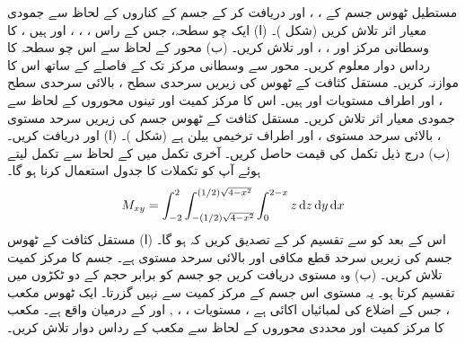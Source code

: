 مستطیل ٹھوس جسم کے ، ،  اور  دریافت کر کے  جسم کے کناروں کے لحاظ سے جمودی معیار اثر تلاش کریں (شکل )۔
(ا) ایک چو سطحہ،  جس کے راس ، ، ،  اور   ہیں ، کا وسطانی مرکز اور ،  ، اور  تلاش کریں۔ (ب) محور  کے لحاظ سے اس  چو سطحہ کا رداس دوار معلوم کریں۔ محور  سے وسطانی مرکز  تک کے   فاصلے کے ساتھ اس کا موازنہ کریں۔
مستقل کثافت کے  ٹھوس   کی زیریں سرحدی سطح ،  بالائی سرحدی سطح ،  اور اطراف  مستویات  اور  ہیں۔ اس کا مرکز کمیت  اور تینوں محوروں کے لحاظ سے جمودی معیار اثر تلاش کریں۔
مستقل کثافت کے   ٹھوس جسم کی زیریں سرحد مستوی ، بالائی سرحد مستوی ،  اور   اطراف ترخیمی بیلن  ہے (شکل )۔ (ا)   اور  دریافت کریں۔ (ب)  درج ذیل تکمل کی قیمت حاصل کریں۔ آخری تکمل میں   کے لحاظ سے تکمل لیتے ہوئے   آپ کو  تکملات کا جدول استعمال کرنا ہو گا۔
\begin{align*}
M_{xy}=\int_{-2}^{2}\int_{-(1/2)\sqrt{4-x^2}}^{(1/2)\sqrt{4-x^2}}\int_{0}^{2-x}z\dif z\dif y\dif x
\end{align*}
اس کے بعد  کو  سے تقسیم کر کے تصدیق کریں کہ  ہو گا۔
(ا) مستقل کثافت کے  ٹھوس جسم کی زیریں سرحد قطع مکافی  اور بالائی سرحد مستوی  ہے۔  جسم  کا مرکز کمیت تلاش کریں۔ (ب)  وہ مستوی  دریافت کریں جو  جسم کو برابر حجم کے دو ٹکڑوں میں تقسیم کرتا ہو۔ یہ مستوی اس جسم کے  مرکز کمیت سے نہیں گزرتا۔
ایک ٹھوس مکعب ، جس  کے اضلاع  کی لمبائیاں   اکائی ہے ، مستویات ، ،  ,  اور   کے درمیان واقع ہے۔  مکعب کا مرکز کمیت اور محددی محوروں کے لحاظ سے مکعب کے  رداس دوار تلاش کریں۔

